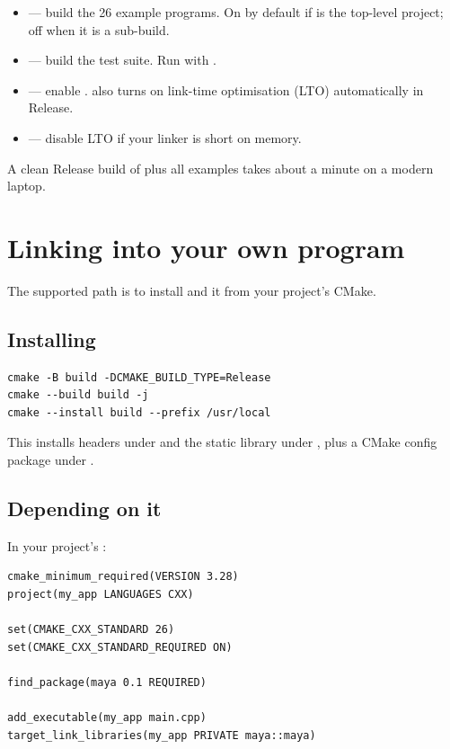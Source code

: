 \begin{itemize}[leftmargin=*]
  \item {} --- build the 26 example
    programs. On by default if \maya{} is the top-level project; off
    when it is a sub-build.
  \item {} --- build the test suite.
    Run with .
  \item {} --- enable
    . \maya{} also turns on link-time
    optimisation (LTO) automatically in Release.
  \item {} ---
    disable LTO if your linker is short on memory.
\end{itemize}

A clean Release build of \maya{} plus all examples takes about a
minute on a modern laptop.

\section{Linking \maya{} into your own program}

The supported path is to install \maya{} and  it
from your project's CMake.

\subsection{Installing}

\begin{lstlisting}[style=shell]
cmake -B build -DCMAKE_BUILD_TYPE=Release
cmake --build build -j
cmake --install build --prefix /usr/local
\end{lstlisting}

This installs headers under  and the
static library under , plus a CMake config
package under .

\subsection{Depending on it}

In your project's :

\begin{lstlisting}[style=shell]
cmake_minimum_required(VERSION 3.28)
project(my_app LANGUAGES CXX)

set(CMAKE_CXX_STANDARD 26)
set(CMAKE_CXX_STANDARD_REQUIRED ON)

find_package(maya 0.1 REQUIRED)

add_executable(my_app main.cpp)
target_link_libraries(my_app PRIVATE maya::maya)
\end{lstlisting}

